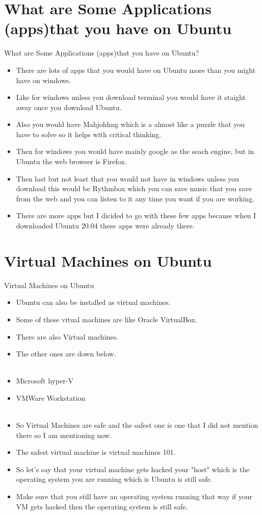 \documentclass[aspectratio=43]{beamer}
\begin{document}
\section{What are Some Applications (apps)that you have on Ubuntu}
\begin{frame}{What are Some Applications (apps)that you have on Ubuntu?}
\begin{itemize}
\item There are lots of apps that you would have on Ubuntu more than you might have on windows.
\item Like for windows unless you download terminal you would have it staight away once you download Ubuntu.
\item Also you would have Mahjohhng which is a almost like a puzzle that you have to solve so it helps with critical thinking.
\item Then for windows you would have mainly google as the seach engine, but in Ubuntu the web browser is Firefox.
\item Then last but not least that you would not have in windows unless you download this would be Rythmbox which you can save music that you save from the web and you can listen to it any time you want if you are working.
\item There are more apps but I dicided to go with these few apps because when I downloaded Ubuntu 20.04 these apps were already there.
\end{itemize}
\end{frame}

\section{Virtual Machines on Ubuntu}
\begin{frame}{Virtual Machines on Ubuntu}
\begin{itemize}
\item Ubuntu can also be installed as virtual machines.
\item Some of these vitual machines are like Oracle VirtualBox.
\item There are also Virtual machines. 
\item The other ones are down below.
\\
~\\
\item Microsoft hyper-V
\item VMWare Workstation
\\
~\\
\item So Virtual Machines are safe and the safest one is one that I did not mention there so I am mentioning now.
\item The safest virtual machine is virtual machines 101.
\item So let's say that your virtual machine gets hacked your "host" which is the operating system you are running which is Ubuntu is still safe.
\item Make sure that you still have an operating system running that way if your VM gets hacked then the operating system is still safe.
\end{itemize}
\end{frame}
\end{document}
